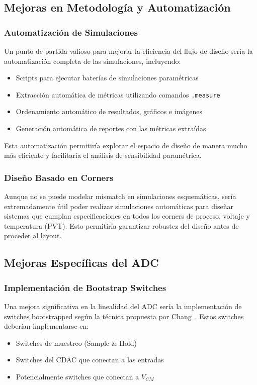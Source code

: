 \documentclass[12pt,a4paper]{report}
\begin{document}
\subsection{Mejoras en Metodología y Automatización}

\subsubsection{Automatización de Simulaciones}

Un punto de partida valioso para mejorar la eficiencia del flujo de diseño sería la automatización completa de las simulaciones, incluyendo:
\begin{itemize}
    \item Scripts para ejecutar baterías de simulaciones paramétricas
    \item Extracción automática de métricas utilizando comandos \texttt{.measure}
    \item Ordenamiento automático de resultados, gráficos e imágenes
    \item Generación automática de reportes con las métricas extraídas
\end{itemize}

Esta automatización permitiría explorar el espacio de diseño de manera mucho más eficiente y facilitaría el análisis de sensibilidad paramétrica.

\subsubsection{Diseño Basado en Corners}

Aunque no se puede modelar mismatch en simulaciones esquemáticas, sería extremadamente útil poder realizar simulaciones automáticas para diseñar sistemas que cumplan especificaciones en todos los corners de proceso, voltaje y temperatura (PVT). Esto permitiría garantizar robustez del diseño antes de proceder al layout.

\subsection{Mejoras Específicas del ADC}

\subsubsection{Implementación de Bootstrap Switches}

Una mejora significativa en la linealidad del ADC sería la implementación de switches bootstrapped según la técnica propuesta por Chang~\cite{chang_sar_thesis}. Estos switches deberían implementarse en:
\begin{itemize}
    \item Switches de muestreo (Sample \& Hold)
    \item Switches del CDAC que conectan a las entradas
    \item Potencialmente switches que conectan a $V_{CM}$
\end{itemize}
\end{document}
